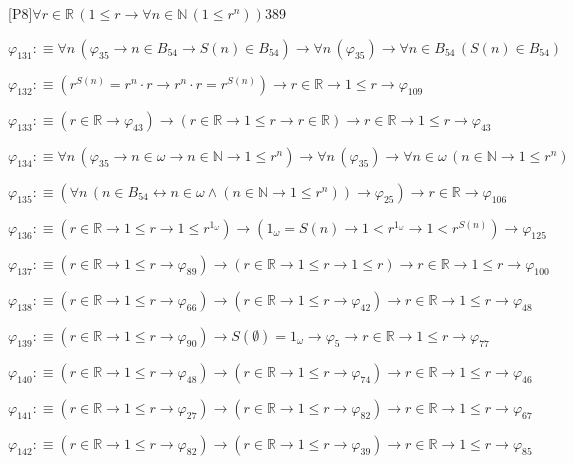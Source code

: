 \begin{fullproof}{[P8]}{$\forall r \in \mathbb{R}\,(1 \leq r \to \forall n \in \mathbb{N}\,(1 \leq {{r}^{n}}))$}{389}
\begin{abbrevlist}
\item $\varphi_{131} :\equiv \forall n\,(\varphi_{35} \to n \in B_{54} \to S(n) \in B_{54}) \to \forall n\,(\varphi_{35}) \to \forall n \in B_{54}\,(S(n) \in B_{54})$
\item $\varphi_{132} :\equiv ({{r}^{S(n)}} = {{r}^{n}} \cdot r \to {{r}^{n}} \cdot r = {{r}^{S(n)}}) \to r \in \mathbb{R} \to 1 \leq r \to \varphi_{109}$
\item $\varphi_{133} :\equiv (r \in \mathbb{R} \to \varphi_{43}) \to (r \in \mathbb{R} \to 1 \leq r \to r \in \mathbb{R}) \to r \in \mathbb{R} \to 1 \leq r \to \varphi_{43}$
\item $\varphi_{134} :\equiv \forall n\,(\varphi_{35} \to n \in \omega \to n \in \mathbb{N} \to 1 \leq {{r}^{n}}) \to \forall n\,(\varphi_{35}) \to \forall n \in \omega\,(n \in \mathbb{N} \to 1 \leq {{r}^{n}})$
\item $\varphi_{135} :\equiv (\forall n\,(n \in B_{54} \leftrightarrow n \in \omega \land (n \in \mathbb{N} \to 1 \leq {{r}^{n}})) \to \varphi_{25}) \to r \in \mathbb{R} \to \varphi_{106}$
\item $\varphi_{136} :\equiv (r \in \mathbb{R} \to 1 \leq r \to 1 \leq {{r}^{1_{\omega}}}) \to (1_{\omega} = S(n) \to 1 < {{r}^{1_{\omega}}} \to 1 < {{r}^{S(n)}}) \to \varphi_{125}$
\item $\varphi_{137} :\equiv (r \in \mathbb{R} \to 1 \leq r \to \varphi_{89}) \to (r \in \mathbb{R} \to 1 \leq r \to 1 \leq r) \to r \in \mathbb{R} \to 1 \leq r \to \varphi_{100}$
\item $\varphi_{138} :\equiv (r \in \mathbb{R} \to 1 \leq r \to \varphi_{66}) \to (r \in \mathbb{R} \to 1 \leq r \to \varphi_{42}) \to r \in \mathbb{R} \to 1 \leq r \to \varphi_{48}$
\item $\varphi_{139} :\equiv (r \in \mathbb{R} \to 1 \leq r \to \varphi_{90}) \to S(\emptyset) = 1_{\omega} \to \varphi_{5} \to r \in \mathbb{R} \to 1 \leq r \to \varphi_{77}$
\item $\varphi_{140} :\equiv (r \in \mathbb{R} \to 1 \leq r \to \varphi_{48}) \to (r \in \mathbb{R} \to 1 \leq r \to \varphi_{74}) \to r \in \mathbb{R} \to 1 \leq r \to \varphi_{46}$
\item $\varphi_{141} :\equiv (r \in \mathbb{R} \to 1 \leq r \to \varphi_{27}) \to (r \in \mathbb{R} \to 1 \leq r \to \varphi_{82}) \to r \in \mathbb{R} \to 1 \leq r \to \varphi_{67}$
\item $\varphi_{142} :\equiv (r \in \mathbb{R} \to 1 \leq r \to \varphi_{82}) \to (r \in \mathbb{R} \to 1 \leq r \to \varphi_{39}) \to r \in \mathbb{R} \to 1 \leq r \to \varphi_{85}$

\end{abbrevlist}
\end{fullproof}
